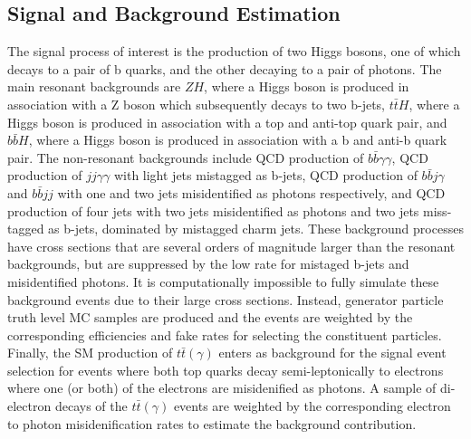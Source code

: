 \subsection{Signal and Background Estimation}
\label{sec:bkgestimation}
The signal process of interest is the production of two Higgs bosons, one of which decays to a pair of b quarks, and the other decaying to a pair of photons. The main resonant backgrounds are $ZH$, where a Higgs boson is produced in association with a Z boson which subsequently decays to two b-jets, $t\bar{t}H$, where a Higgs boson is produced in association with a top and anti-top quark pair, and $b\bar{b}H$, where a Higgs boson is produced in association with a b and anti-b quark pair. The non-resonant backgrounds include QCD production  of $b \bar{b} \gamma\gamma$, QCD production of $jj \gamma\gamma$ with light jets mistagged  as b-jets, QCD production of $b \bar{b} j \gamma$ and $b \bar{b} jj$ with one and two jets misidentified as photons respectively, and QCD production of four jets with two jets misidentified  as photons and two jets miss-tagged as b-jets, dominated by mistagged charm jets. 
These background processes have cross sections that are several orders of magnitude larger than the resonant backgrounds, but are suppressed
by the low rate for mistaged b-jets and misidentified photons.  It is computationally impossible to fully simulate these background events due to their large cross sections. Instead, generator particle truth level MC samples are produced and the events are weighted by the corresponding efficiencies and fake rates for selecting the constituent particles. Finally, the SM  production of $t\bar{t}(\gamma)$ enters as background for the signal event selection for events where both top quarks decay semi-leptonically to electrons where one (or both) of the electrons are misidenified as photons. A sample of di-electron decays of the $t\bar{t}(\gamma)$ events are weighted by the corresponding electron to photon misidenification rates to estimate the background contribution.



